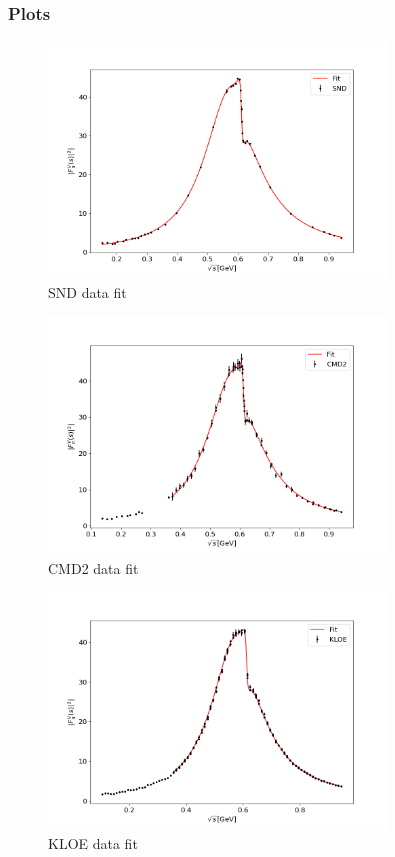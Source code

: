 \documentclass[a4paper]{article}
\begin{document}
\subsubsection{Plots\label{plots}}
\begin{figure}[H]
    \centering
    \includegraphics[width=0.8\textwidth]{./plots/SND.png}
    \caption{SND data fit\label{fig1}}
\end{figure}
\begin{figure}[H]
    \centering
    \includegraphics[width=0.8\textwidth]{./plots/CMD2.png}
    \caption{CMD2 data fit\label{fig2}}
\end{figure}
\begin{figure}[H]
    \centering
    \includegraphics[width=0.8\textwidth]{./plots/KLOE.png}
    \caption{KLOE data fit\label{fig3}}
\end{figure}
\end{document}
